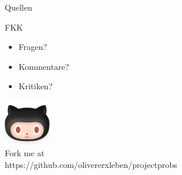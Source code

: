 \documentclass[12pt]{beamer}
\begin{document}
	\begin{frame}{Quellen}
		
	\end{frame}

	\begin{frame}{FKK}
		\begin{itemize}
			\item{Fragen?}
			\item{Kommentare?}
			\item{Kritiken?}
		\end{itemize}

	\end{frame}

	\thispagestyle{empty}
	\begin{frame}
		\begin{center}
			\includegraphics[width=0.15\textwidth]{images/github} \\
			Fork me at \\
			https://github.com/olivererxleben/projectprobs
		\end{center}
	\end{frame}
\end{document}
